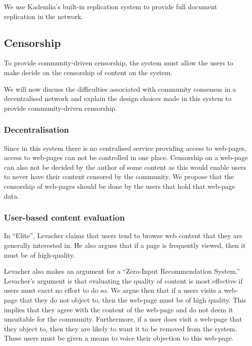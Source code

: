 We use Kademlia's built-in replication system to provide full document replication in the network.


\subsection{Censorship}

To provide community-driven censorship, the system must allow the users to make decide on the censorship of content
on the system.

We will now discuss the difficulties associated with community consensus in a decentralised network and explain the
design choices made in this system to provide community-driven censorship.

\subsubsection{Decentralisation}

Since in this system there is no centralised service providing access to web-pages, access to web-pages can not be
controlled in one place.
Censorship on a web-page can also not be decided by the author of some content as this would enable users to never
have their content censored by the community.
We propose that the censorship of web-pages should be done by the users that hold that web-page data.

\subsubsection{User-based content evaluation}

In ``Elite'', Levacher claims that users tend to browse web content that they are generally interested in.
He also argues that if a page is frequently viewed, then it must be of high-quality.

Levacher also makes an argument for a ``Zero-Input Recommendation System.'' Levacher's argument is that evaluating the quality of
content is most effective if users must exert no effort to do so. We argue then that if a users visits a web-page that they do not
object to, then the web-page must be of high quality. This implies that they agree with the content of the web-page and do not deem
it unsuitable for the community. Furthermore, if a user does visit a web-page that they object to, then they are likely to want it to be removed from the system. These users must be given a means to voice their objection to this web-page.

